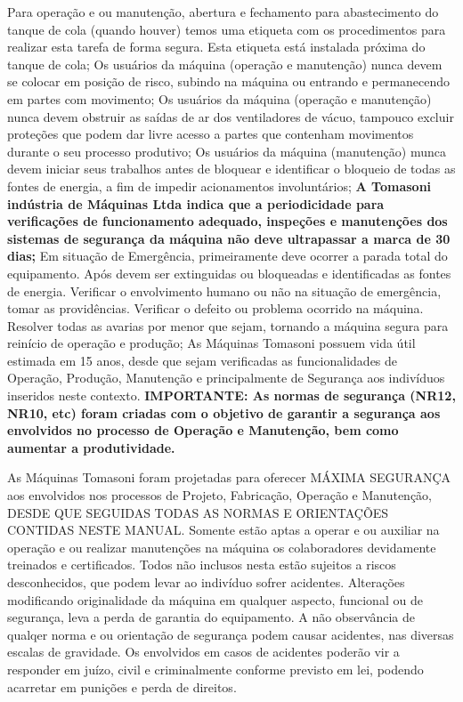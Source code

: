 Para operação e ou manutenção, abertura e fechamento para abastecimento do tanque de cola (quando houver) temos
uma etiqueta com os procedimentos para realizar esta tarefa de forma segura. Esta etiqueta está instalada próxima do
tanque de cola;
Os usuários da máquina (operação e manutenção) nunca devem se colocar em posição de risco, subindo na máquina ou
entrando e permanecendo em partes com movimento;
Os usuários da máquina (operação e manutenção) nunca devem obstruir as saídas de ar dos ventiladores de vácuo,
tampouco excluir proteções que podem dar livre acesso a partes que contenham movimentos durante o seu processo
produtivo;
Os usuários da máquina (manutenção) munca devem iniciar seus trabalhos antes de bloquear e identificar o bloqueio de
todas as fontes de energia, a fim de impedir acionamentos involuntários;
\textbf{A Tomasoni indústria de Máquinas Ltda indica que a periodicidade para verificações de funcionamento adequado,
inspeções e manutenções dos sistemas de segurança da máquina não deve ultrapassar a marca de 30 dias;}
Em situação de Emergência, primeiramente deve ocorrer a parada total do equipamento. Após devem ser extinguidas ou
bloqueadas e identificadas as fontes de energia. Verificar o envolvimento humano ou não na situação de emergência,
tomar as providências. Verificar o defeito ou problema ocorrido na máquina. Resolver todas as avarias por menor que
sejam, tornando a máquina segura para reinício de operação e produção;
As Máquinas Tomasoni possuem vida útil estimada em 15 anos, desde que sejam verificadas as funcionalidades de
Operação, Produção, Manutenção e principalmente de Segurança aos indivíduos inseridos neste contexto.
\textbf{IMPORTANTE: As normas de segurança (NR12, NR10, etc) foram criadas com o objetivo de garantir a segurança aos
envolvidos no processo de Operação e Manutenção, bem como aumentar a produtividade.
}
\vspace*{\fill}

\newpage
\thispagestyle{fancy}
\vspace*{\fill}

As Máquinas Tomasoni foram projetadas para oferecer MÁXIMA SEGURANÇA aos envolvidos nos processos de Projeto,
Fabricação, Operação e Manutenção, DESDE QUE SEGUIDAS TODAS AS NORMAS E ORIENTAÇÕES CONTIDAS NESTE
MANUAL.
Somente estão aptas a operar e ou auxiliar na operação e ou realizar
manutenções na máquina os colaboradores devidamente treinados e certificados.
Todos não inclusos nesta estão sujeitos a riscos desconhecidos, que podem
levar ao indivíduo sofrer acidentes.
Alterações modificando originalidade da máquina em qualquer aspecto, funcional
ou de segurança, leva a perda de garantia do equipamento.
A não observância de qualqer norma e ou orientação de segurança podem causar
acidentes, nas diversas escalas de gravidade. Os envolvidos em casos de
acidentes poderão vir a responder em juízo, civil e criminalmente conforme
previsto em lei, podendo acarretar em punições e perda de direitos.

